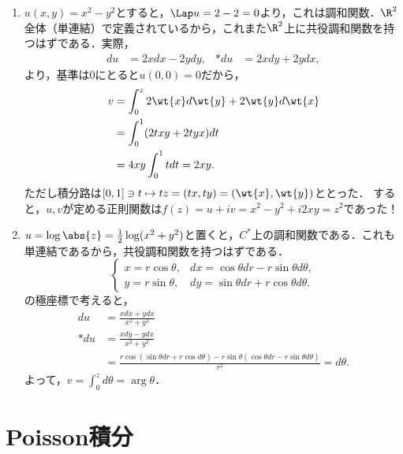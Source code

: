 \documentclass[uplatex, dvipdfmx]{jsreport}
\begin{document}
\begin{example}[共役調和関数]\mbox{}
    \begin{enumerate}
        \item $u(x,y)=x^2-y^2$とすると，$\Lap u=2-2=0$より，これは調和関数．$\R^2$全体（単連結）で定義されているから，これまた$\R^2$上に共役調和関数を持つはずである．実際，
        \begin{align*}
            du&=2xdx-2ydy,&*du&=2xdy+2ydx,
        \end{align*}
        より，基準は$0$にとると$u(0,0)=0$だから，
        \begin{align*}
            v&=\int^z_02\wt{x}d\wt{y}+2\wt{y}d\wt{x}\\
            &=\int^1_0(2txy+2tyx)dt\\
            &=4xy\int^1_0tdt=2xy.
        \end{align*}
        ただし積分路は$[0,1]\ni t\mapsto tz=(tx,ty)=(\wt{x},\wt{y})$ととった．
        すると，$u,v$が定める正則関数は$f(z)=u+iv=x^2-y^2+i2xy=z^2$であった！
        \item $u=\log\abs{z}=\frac{1}{2}\log(x^2+y^2)$と置くと，$C^*$上の調和関数である．これも単連結であるから，共役調和関数を持つはずである．
        \[\begin{cases}
            x=r\cos\theta,&dx=\cos\theta dr-r\sin\theta d\theta,\\
            y=r\sin\theta,&dy=\sin\theta dr+r\cos\theta d\theta.
        \end{cases}\]
        の極座標で考えると，
        \begin{align*}
            du&=\frac{xdx+ydx}{x^2+y^2}\\
            *du&=\frac{xdy-ydx}{x^2+y^2}\\
            &=\frac{r\cos(\sin\theta dr+r\cos d\theta)-r\sin\theta(\cos\theta dr-r\sin\theta d\theta)}{r^2}=d\theta.
        \end{align*}
        よって，$v=\int^z_0d\theta=\arg\theta$．
    \end{enumerate}
\end{example}

\section{Poisson積分}
\end{document}
